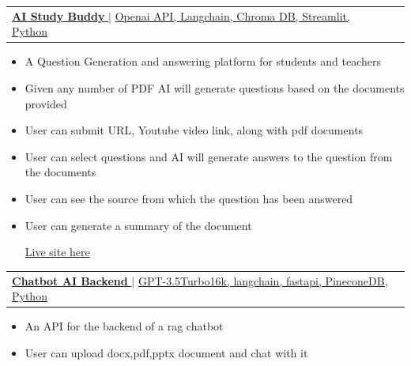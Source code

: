 \documentclass[letterpaper,11pt]{article}
\makeatletter
\newcommand{\resumeItem}[1]{
  \item\small{
    {#1 \vspace{-2pt}}
  }
}
\newcommand{\resumeProjectHeading}[2]{
    \item
    \begin{tabular*}{1.001\textwidth}{l@{\extracolsep{\fill}}r}
      \small#1 & \textbf{\small #2}\\
    \end{tabular*}\vspace{-7pt}
}
\newcommand{\resumeItemListStart}{\begin{itemize}}
\newcommand{\resumeItemListEnd}{\end{itemize}\vspace{-5pt}}
\makeatother
\begin{document}

    \vspace{-18pt}
       \resumeProjectHeading
          {\href{https://github.com/remon-rakibul/AI-Study-Buddy}{\textbf{\large{{AI Study Buddy}}} \href{https://github.com/remon-rakibul/AI-Study-Buddy}{\raisebox{-0.1\height}\faExternalLink }} $|$ \large{\underline{Openai API, Langchain, Chroma DB, Streamlit, Python}}}{}
          \vspace{-13pt}
          \resumeItemListStart
            \resumeItem{\normalsize{A Question Generation and answering platform for students and teachers}}
            \resumeItem{\normalsize{Given any number of PDF AI will generate questions based on the documents provided}}
            \resumeItem{\normalsize{User can submit URL, Youtube video link, along with pdf documents}}
            \resumeItem{\normalsize{User can select questions and AI will generate answers to the question from the documents}}
            \resumeItem{\normalsize{User can see the source from which the question has been answered}}
            \resumeItem{\normalsize{User can generate a summary of the document}}

            {\textcolor{accent} {\href{https://ai-study-buddy-qxb2jcy4zaqmzcuuryedhl.streamlit.app/} {\underline{\normalsize{Live site here}}}}}
          \resumeItemListEnd 
          \vspace{-18pt}

        \resumeProjectHeading
          {\href{https://github.com/remon-rakibul/chatbot-demo-api}{\textbf{\large{{Chatbot AI  Backend}}} \href{https://github.com/remon-rakibul/chatbot-demo-api}{\raisebox{-0.1\height}\faExternalLink }} $|$ \large{\underline{GPT-3.5Turbo16k, langchain, fastapi, PineconeDB, Python}}}{}
          \vspace{-13pt}
          \resumeItemListStart
            \resumeItem{\normalsize{An API for the backend of a rag chatbot}}
            \resumeItem{\normalsize{User can upload docx,pdf,pptx document and chat with it}}
          \resumeItemListEnd 
          \vspace{-18pt}
\end{document}
